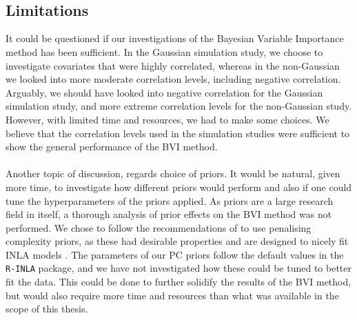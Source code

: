 \\
\\
\subsection*{Limitations}
It could be questioned if our investigations of the Bayesian Variable Importance method has been sufficient. In the Gaussian simulation study, we choose to investigate covariates that were highly correlated, whereas in the non-Gaussian we looked into more moderate correlation levels, including negative correlation. Arguably, we should have looked into negative correlation for the Gaussian simulation study, and more extreme correlation levels for the non-Gaussian study. However, with limited time and resources, we had to make some choices. We believe that the correlation levels used in the simulation studies were sufficient to show the general performance of the BVI method.
\\
\\
Another topic of discussion, regards choice of priors. It would be natural, given more time, to investigate how different priors would perform and also if one could tune the hyperparameters of the priors applied. As priors are a large research field in itself, a thorough analysis of prior effects on the BVI method was not performed. We chose to follow the recommendations of \citet{simpson2017penalising} to use penalising complexity priors, as these had desirable properties and are designed to nicely fit INLA models \citep{simpson2017penalising}. The parameters of our PC priors follow the default values in the \texttt{R-INLA} package, and we have not investigated how these could be tuned to better fit the data. This could be done to further solidify the results of the BVI method, but would also require more time and resources than what was available in the scope of this thesis. 

